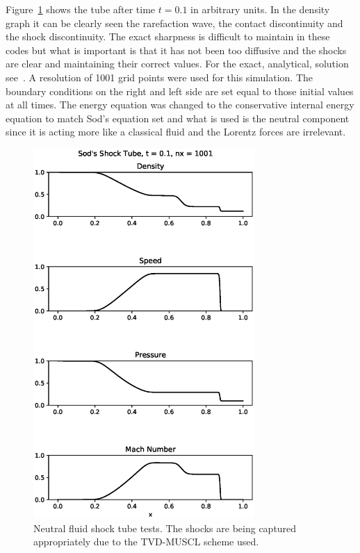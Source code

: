 \documentclass[12pt,upcase]{umlthesis}
\begin{document}
Figure~\ref{fig:shocktube} shows the tube after time $t = 0.1$ in arbitrary units. In the density graph it can be clearly seen the rarefaction wave, the contact discontinuity and the shock discontinuity. The exact sharpness is difficult to maintain in these codes but what is important is that it has not been too diffusive and the shocks are clear and maintaining their correct values. For the exact, analytical, solution see~\citet{Sod1978}. A resolution of 1001 grid points were used for this simulation. The boundary conditions on the right and left side are set equal to those initial values at all times. The energy equation was changed to the conservative internal energy equation to match Sod's equation set and what is used is the neutral component since it is acting more like a classical fluid and the Lorentz forces are irrelevant.

\begin{figure}[ht!]
	\centering
	\includegraphics[width=0.75\textwidth]{images/shocktube.eps}
	\caption{Neutral fluid shock tube tests. The shocks are being captured appropriately due to the TVD-MUSCL scheme used.}\label{fig:shocktube}
\end{figure}
\end{document}
